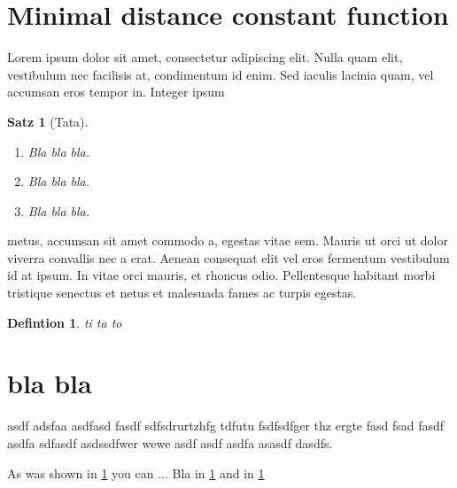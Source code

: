 \documentclass[a4paper]{scrartcl}
\newtheorem{theorem}{Satz}
\newtheorem{definition}{Defintion}
\begin{document}
\section{Minimal distance constant function}\label{sec:minimal-distance}
Lorem ipsum dolor sit amet, consectetur adipiscing elit. Nulla
quam elit, vestibulum nec facilisis at, condimentum id enim. Sed
iaculis lacinia quam, vel accumsan eros tempor in. Integer ipsum

\begin{theorem}[Tata]\label{thm:bla-blup}
\begin{enumerate}
\item Bla bla bla.
\item Bla bla bla.
\item Bla bla bla.
\end{enumerate}
\end{theorem}

metus, accumsan sit amet commodo a, egestas vitae sem. Mauris ut
orci ut dolor viverra convallis nec a erat. Aenean consequat elit
vel eros fermentum vestibulum id at ipsum. In vitae orci mauris, et
rhoncus odio. Pellentesque habitant morbi tristique senectus et netus
et malesuada fames ac turpis egestas.

\begin{definition}\label{def:aha}
ti ta to
\end{definition}

\section{bla bla}
asdf adsfaa  asdfasd fasdf sdfsdrurtzhfg tdfutu  fsdfsdfger thz ergte
 fasd fsad fasdf asdfa sdfasdf asdssdfwer wewe asdf asdf asdfa asasdf
dasdfs.

As was shown in \cref{sec:minimal-distance} you can ...
Bla in \cref{thm:bla-blup} and in \cref{def:aha}
\end{document}
